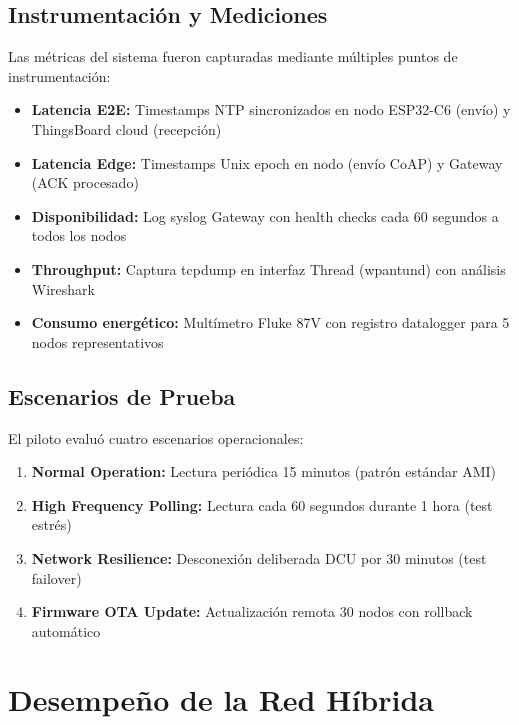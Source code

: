 \subsection{Instrumentación y Mediciones}
\label{sec:res-instrumentacion}

Las métricas del sistema fueron capturadas mediante múltiples puntos de instrumentación:

\begin{itemize}
    \item \textbf{Latencia E2E:} Timestamps NTP sincronizados en nodo ESP32-C6 (envío) y ThingsBoard cloud (recepción)
    \item \textbf{Latencia Edge:} Timestamps Unix epoch en nodo (envío CoAP) y Gateway (ACK procesado)
    \item \textbf{Disponibilidad:} Log syslog Gateway con health checks cada 60 segundos a todos los nodos
    \item \textbf{Throughput:} Captura tcpdump en interfaz Thread (wpantund) con análisis Wireshark
    \item \textbf{Consumo energético:} Multímetro Fluke 87V con registro datalogger para 5 nodos representativos
\end{itemize}

\subsection{Escenarios de Prueba}
\label{sec:res-escenarios}

El piloto evaluó cuatro escenarios operacionales:

\begin{enumerate}
    \item \textbf{Normal Operation:} Lectura periódica 15 minutos (patrón estándar AMI)
    \item \textbf{High Frequency Polling:} Lectura cada 60 segundos durante 1 hora (test estrés)
    \item \textbf{Network Resilience:} Desconexión deliberada DCU por 30 minutos (test failover)
    \item \textbf{Firmware OTA Update:} Actualización remota 30 nodos con rollback automático
\end{enumerate}

\section{Desempeño de la Red Híbrida}
\label{sec:res-desempeno-red}

